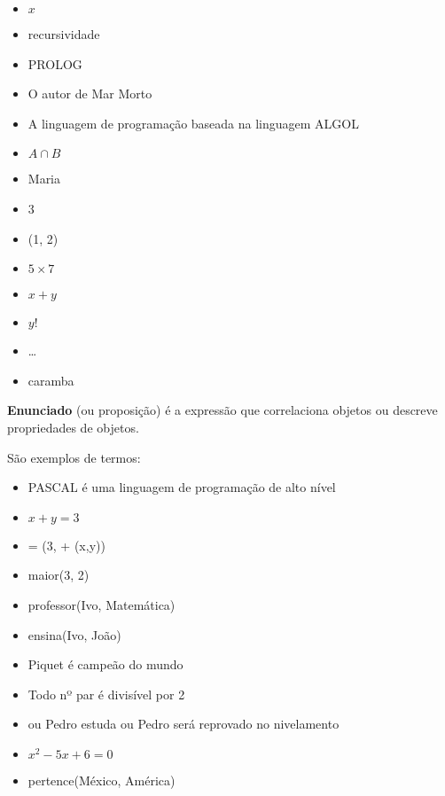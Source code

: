 \documentclass[
	14pt,				%
	twoside,			%
	a4paper,			%
	english,			%
	french,				%
	spanish,			%
	brazil,				%
    ]{abntex2}
\begin{document}
\begin{itemize}[itemsep=0.01pt]
\renewcommand\labelitemi{\textbf{-}}
    \item $x$
    \item recursividade
    \item PROLOG
    \item  O autor de Mar Morto
    \item  A linguagem de programação baseada na linguagem ALGOL
    \item $A \cap B$
    \item Maria
    \item 3
    \item (1, 2)
    \item $5 \times 7$
    \item $x + y$
    \item $y!$
    \item \dots
    \item caramba

\end{itemize}

\textbf{Enunciado} (ou proposição) é a expressão que correlaciona objetos ou descreve propriedades de objetos.

\noindent São exemplos de termos:

\begin{itemize}[itemsep=0.01pt]
\renewcommand\labelitemi{\textbf{-}}
    \item PASCAL é uma linguagem de programação de alto nível
    \item $x + y = 3$
    \item  = (3, + (x,y))
    \item  maior(3, 2)
    \item professor(Ivo, Matemática)
    \item ensina(Ivo, João)
    \item Piquet é campeão do mundo
    \item Todo nº par é divisível por 2
    \item ou Pedro estuda ou Pedro será reprovado no nivelamento
    \item $x^2 - 5x + 6 = 0$
    \item pertence(México, América)
\end{itemize}

\newpage
\end{document}

